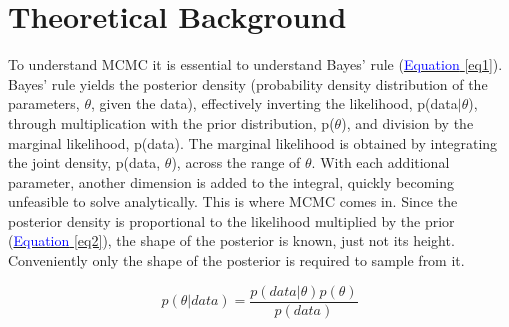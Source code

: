 \section{Theoretical Background}\label{RWM_example}
To understand MCMC it is essential to understand Bayes’ rule (\hyperref[eq1]{\textcolor{blue}{Equation} \ref{eq1}}). Bayes’ rule yields the posterior density (probability density distribution of the parameters, $\theta$, given the data), effectively inverting the likelihood, p(data$|\theta$), through multiplication with the prior distribution, p($\theta$), and division by the marginal likelihood, p(data). The marginal likelihood is obtained by integrating the joint density, p(data, $\theta$), across the range of $\theta$. With each additional parameter, another dimension is added to the integral, quickly becoming unfeasible to solve analytically. This is where MCMC comes in. Since the posterior density is proportional to the likelihood multiplied by the prior (\hyperref[eq2]{\textcolor{blue}{Equation} \ref{eq2}}), the shape of the posterior is known, just not its height. Conveniently only the shape of the posterior is required to sample from it. 

\begin{equation}
p(\theta|data) = \frac{p(data|\theta)p(\theta)}{p(data)}\label{eq1}
\end{equation}

